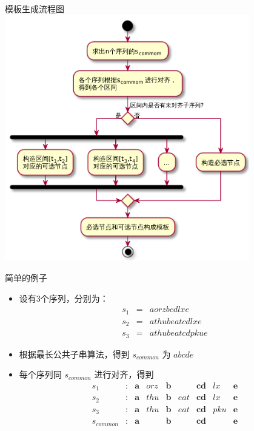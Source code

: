 \begin{frame}[label=sec-2-18]{模板生成流程图}
\includegraphics[width=0.8\textwidth]{subsystem}
\end{frame}

\begin{frame}[label=sec-2-19]{简单的例子}
\begin{itemize}
\item 设有3个序列，分别为：
\begin{eqnarray*}
s_1&=&aorzbcdlxe\\
s_2&=&athubeatcdlxe\\
s_3&=&athubeatcdpkue
\end{eqnarray*}
\item 根据最长公共子串算法，得到 $s_{common}$ 为 $abcde$
\item 每个序列同 $s_{common}$ 进行对齐，得到
\begin{displaymath}
\begin{matrix}
s_1      & : & \mathbf{a} & orz & \mathbf{b} &   & \mathbf{cd} &lx & \mathbf{e}\\
s_2      &:&\mathbf{a}&thu&\mathbf{b}&eat&\mathbf{cd}&lx&\mathbf{e}\\
s_3      &:&\mathbf{a}&thu&\mathbf{b}&eat&\mathbf{cd}&pku&\mathbf{e}\\
s_{common}&:&\mathbf{a}&   &\mathbf{b}&   &\mathbf{cd}&   &\mathbf{e}\\
\end{matrix}
\end{displaymath}
\end{itemize}
\end{frame}

